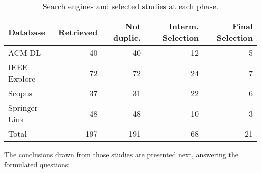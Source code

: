 \begin{table}[h]
    \begin{tabular}{l r r r r}
    \hline
    Database &        Retrieved & 
                                Not duplic. & 
                                         Interm. Selection & 
                                               Final Selection\\
    \hline
    ACM	DL			& 40 &      40 &     12  & 5 \\
    IEEE Explore	& 72 &      72 &     24  & 7 \\
    Scopus			& 37 &      31 &     22  & 6 \\
    Springer Link	& 48 &      48 &     10  & 3 \\
    \hline
    Total           & 197 &    191 &     68  & 21 \\
    \hline
    
    \end{tabular}
    \caption{Search engines and selected studies at each phase.}\label{tab:results}
\end{table}

The conclusions drawn from those studies are presented next, answering the formulated questions:

